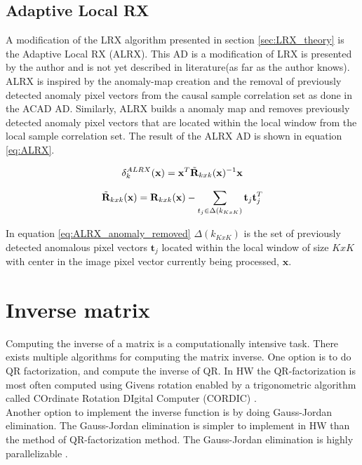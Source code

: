 \subsection{Adaptive Local RX}
\label{sec:Adaptive_LRX_theory}
A modification of the LRX algorithm presented in section \ref{sec:LRX_theory} is the Adaptive Local RX (ALRX). This AD is a modification of LRX is presented by the author and is not yet described in literature(as far as the author knows). 
\\

ALRX is inspired by the anomaly-map creation and the removal of previously detected anomaly pixel vectors from the causal sample correlation set as done in the ACAD AD. Similarly, ALRX builds a anomaly map and removes previously detected anomaly pixel vectors that are located within the local window from the local sample correlation set. The result of the ALRX AD is shown in equation \ref{eq:ALRX}. 

\begin{equation}
    \delta_k^{ALRX}(\textbf{x}) = \textbf{x}^T\Tilde{\textbf{R}}_{k x k}(\textbf{x})^{-1}\textbf{x}
    \label{eq:ALRX}
\end{equation}


\begin{equation}
   \Tilde{\textbf{R}}_{k x k}(\textbf{x})= \textbf{R}_{k x k}(\textbf{x})-\sum_{t_j\in\Delta(k_{KxK})}\textbf{t}_j\textbf{t}_j^T
    \label{eq:ALRX_anomaly_removed}
\end{equation}

In equation \ref{eq:ALRX_anomaly_removed} $\Delta(k_{KxK})$ is the set of previously detected anomalous pixel vectors $\textbf{t}_j$ located within the local window of size $KxK$ with center in the image pixel vector currently being processed, $\textbf{x}$.

\section{Inverse matrix}
Computing the inverse of a matrix is a computationally intensive task. There exists multiple algorithms for computing the matrix inverse. One option is to do QR factorization\cite{QRD_fpga}, and compute the inverse of QR. In HW the QR-factorization is most often computed using Givens rotation enabled by a trigonometric algorithm called COrdinate Rotation DIgital Computer (CORDIC) \cite{CORDIC}. \\

Another option to implement the inverse function is by doing Gauss-Jordan elimination. The Gauss-Jordan elimination is simpler to implement in HW than the method of QR-factorization method. The Gauss-Jordan elimination is highly parallelizable \cite{gauss_jordan_fpga}. 

